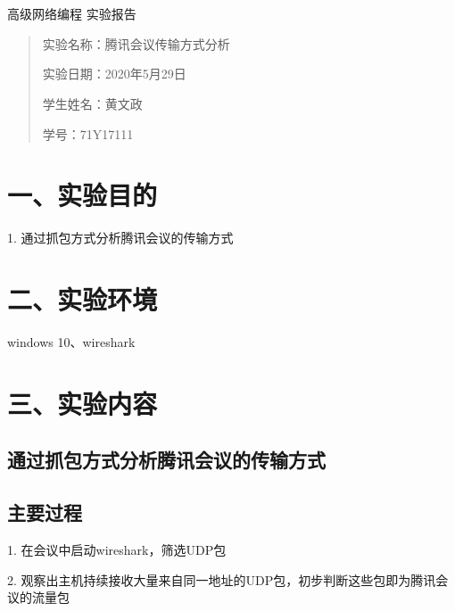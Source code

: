 \documentclass[UTF8]{ctexart}
\begin{document}
	\begin{center}
		\quad \\
		\quad \\
		\heiti \fontsize{45}{17} 高级网络编程
		\vskip 2.0cm
		\heiti \fontsize{39}{17} 实验报告	
	\end{center}
	\vskip 3.5cm
	\begin{quotation}
		\par\setlength\parindent{8.5em}
		\quad 
		\heiti 
		
		实验名称：腾讯会议传输方式分析
		
		实验日期：2020年5月29日
	
		学生姓名：黄文政
		
		学\hspace{0.72cm}号：71Y17111
		
		\vskip 2cm
		\centering
	\end{quotation}
	
\newpage
\songti \fontsize{13}{13}
\large
\section*{一、实验目的}

1. 通过抓包方式分析腾讯会议的传输方式


\section*{二、实验环境}
windows 10、wireshark

\section*{三、实验内容}
\subsection*{\textbf{通过抓包方式分析腾讯会议的传输方式
}}
\subsection*{主要过程}

1. 在会议中启动wireshark，筛选UDP包

2. 观察出主机持续接收大量来自同一地址的UDP包，初步判断这些包即为腾讯会议的流量包
\end{document}
